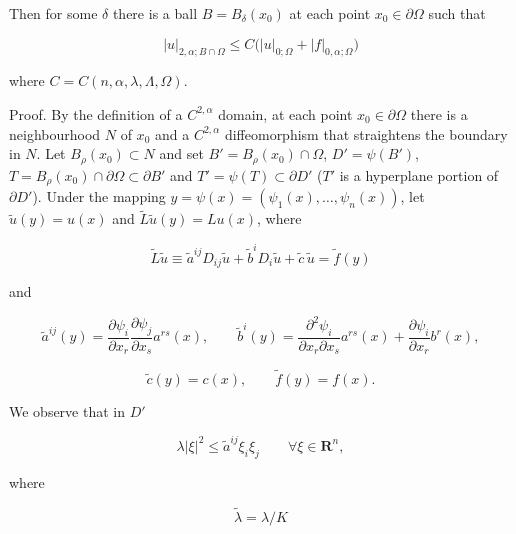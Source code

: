 
Then for some $\delta$ there is a ball $B = B_\delta(x_0)$ at each point $x_0 \in \partial \Omega$ such that

\begin{equation}
\tag{6.32}
|u|_{2,\alpha;B\cap\Omega} \le C\bigl(|u|_{0;\Omega} + |f|_{0,\alpha;\Omega}\bigr)
\end{equation}

\noindent where $C = C(n,\alpha,\lambda,\Lambda,\Omega)$.

Proof. By the definition of a $C^{2,\alpha}$ domain, at each point $x_0 \in \partial \Omega$ there is a neighbourhood $N$ of $x_0$ and a $C^{2,\alpha}$ diffeomorphism that straightens the boundary in $N$. Let $B_\rho(x_0)\subset N$ and set $B' = B_\rho(x_0)\cap \Omega$, $D'=\psi(B')$, $T=B_\rho(x_0)\cap \partial\Omega\subset \partial B'$ and $T'=\psi(T)\subset \partial D'$ ($T'$ is a hyperplane portion of $\partial D'$). Under the mapping $y=\psi(x)=(\psi_1(x),\ldots,\psi_n(x))$, let $\tilde u(y)=u(x)$ and $\tilde L\tilde u(y)=Lu(x)$, where

\begin{equation*}
\tilde L\tilde u \equiv \tilde a^{ij}D_{ij}\tilde u+\tilde b^iD_i\tilde u+\tilde c\,\tilde u=\tilde f(y)
\end{equation*}

\noindent and

\begin{equation*}
\tilde a^{ij}(y)=\frac{\partial\psi_i}{\partial x_r}\frac{\partial\psi_j}{\partial x_s}a^{rs}(x),\qquad
\tilde b^i(y)=\frac{\partial^2\psi_i}{\partial x_r\partial x_s}a^{rs}(x)+\frac{\partial\psi_i}{\partial x_r}b^r(x),
\end{equation*}

\begin{equation*}
\tilde c(y)=c(x),\qquad \tilde f(y)=f(x).
\end{equation*}

\noindent We observe that in $D'$

\begin{equation*}
\lambda |\xi|^2 \le \tilde a^{ij}\xi_i\xi_j \qquad \forall \xi \in \mathbf{R}^n,
\end{equation*}

\noindent where

\begin{equation}
\tag{6.33}
\tilde\lambda = \lambda/K
\end{equation}


